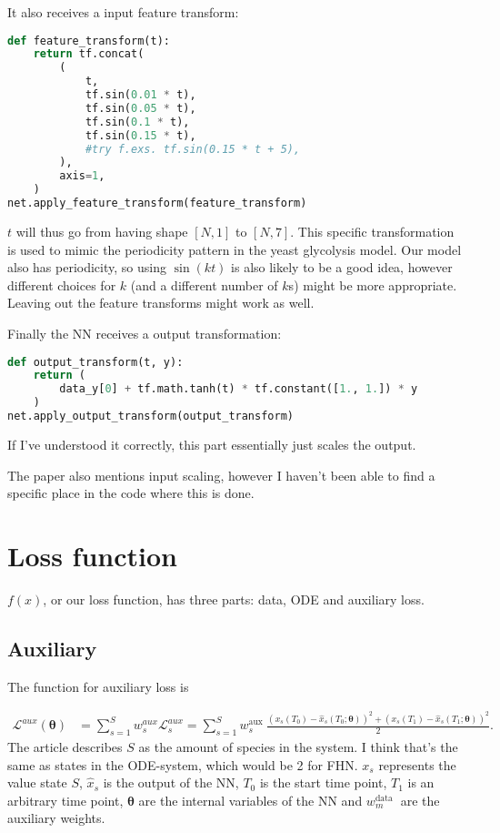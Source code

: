 \documentclass[a4paper]{article}
\begin{document}
It also receives a input feature transform:
\begin{lstlisting}[language=python]
def feature_transform(t):
	return tf.concat(
		(
			t,
			tf.sin(0.01 * t),
			tf.sin(0.05 * t),
			tf.sin(0.1 * t),
			tf.sin(0.15 * t),
			#try f.exs. tf.sin(0.15 * t + 5),
		),
		axis=1,
	)
net.apply_feature_transform(feature_transform)
\end{lstlisting}
$t$ will thus go from having shape $[N, 1]$ to $[N, 7]$. 
This specific transformation is used to mimic the periodicity pattern in the yeast glycolysis model. Our model also has periodicity, so using $\sin(kt)$ is also likely to be a good idea, however different choices for $k$ (and a different number of $k$s) might be more appropriate. Leaving out the feature transforms might work as well. 

Finally the NN receives a output transformation:
\begin{lstlisting}[language=python]
def output_transform(t, y):
	return (
		data_y[0] + tf.math.tanh(t) * tf.constant([1., 1.]) * y
	)
net.apply_output_transform(output_transform)
\end{lstlisting}
If I've understood it correctly, this part essentially just scales the output.

The paper also mentions input scaling, however I haven't been able to find a specific place in the code where this is done.




\section{Loss function}

$f(x)$, or our loss function, has three parts: data, ODE and auxiliary loss. 

\subsection{Auxiliary}

The function for auxiliary loss is

\begin{align}
\mathcal{L}^{a u x}(\boldsymbol{\theta}) &= \sum_{s=1}^{S} w_{s}^{a u x} \mathcal{L}_{s}^{a u x}=\sum_{s=1}^{S} w_{s}^{\text {aux }} \frac{\left(x_{s}\left(T_{0}\right)-\hat{x}_{s}\left(T_{0} ; \boldsymbol{\theta}\right)\right)^{2}+\left(x_{s}\left(T_{1}\right)-\hat{x}_{s}\left(T_{1} ; \boldsymbol{\theta}\right)\right)^{2}}{2}.
\end{align}
The article describes $S$ as the amount of species in the system. I think that's the same as states in the ODE-system, which would be 2 for FHN. 
$x_s$ represents the value state $S$, $\hat{x}_{s}$ is the output of the NN, $T_0$ is the start time point, $T_1$ is an arbitrary time point, $\boldsymbol{\theta}$ are the internal variables of the NN and $w_{m}^{\text {data }}$ are the auxiliary weights.
\end{document}
